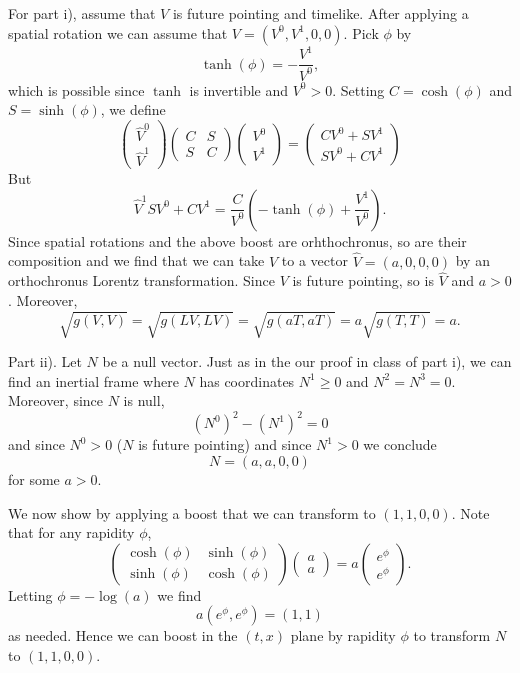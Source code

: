 \documentclass[minion]{homework}
\begin{document}
\begin{aproblems}
For part i), assume that $V$ is future pointing and timelike. After applying
a spatial rotation we can assume that $V=(V^0,V^1,0,0)$. Pick $\phi$ by
\[
\tanh(\phi) = -\frac{V^1}{V^0},
\]
which is possible since $\tanh$ is invertible and $V^0>0$.
Setting $C=\cosh(\phi)$ and $S=\sinh(\phi)$, we define
\[
\begin{pmatrix} \hat V^0\\\hat V^1\end{pmatrix} \begin{pmatrix} C & S\\ S & C \end{pmatrix} \begin{pmatrix} V^0\\V^1\end{pmatrix} = \begin{pmatrix} C V^0 + S V^1\\ S V^0 + C V^1\end{pmatrix}
\]
But
\[
\hat V^1 S V^0 + C V^1 = \frac{C}{V^0} \left( -\tanh(\phi) + \frac{V^1}{V^0}\right).
\]
Since spatial rotations and the above boost are orhthochronus, so are their
composition and we find that we can take $V$ to a vector $\hat V =(a,0,0,0)$ by
an orthochronus Lorentz transformation.  Since $V$ is future pointing, so
is $\hat V$ and $a>0$. Moreover,
\begin{equation}
\sqrt{g(V,V)} = \sqrt{g(LV,LV)} =\sqrt{g(aT,aT)}=a\sqrt{g(T,T)} = a.
\end{equation}

 Part ii). Let $N$ be a null vector. Just as in
the our proof in class of part i), we can find an inertial frame where $N$ has
coordinates $N^1\ge 0$ and $N^2=N^3=0$.  Moreover, since $N$ is null,
\begin{equation}
(N^0)^2-(N^1)^2 = 0
\end{equation}
and since $N^0>0$ ($N$ is future pointing) and since $N^1>0$ we conclude
\begin{equation}
N = (a,a,0,0)
\end{equation}
for some $a>0$.

We now show by applying a boost that we can transform to $(1,1,0,0)$.
Note that for any rapidity $\phi$,
\begin{equation}
\begin{pmatrix} \cosh(\phi) & \sinh(\phi) \\ \sinh(\phi) & \cosh(\phi) \end{pmatrix}
\begin{pmatrix} a \\ a \end{pmatrix} = a\begin{pmatrix} e^\phi \\ e^\phi \end{pmatrix}.
\end{equation}
Letting $\phi=-\log(a)$ we find
\begin{equation}
a(e^\phi,e^\phi) = (1,1)
\end{equation}
as needed.  Hence we can boost in the $(t,x)$ plane by rapidity $\phi$ to transform
$N$ to $(1,1,0,0)$.


\end{aproblems}
\end{document}
